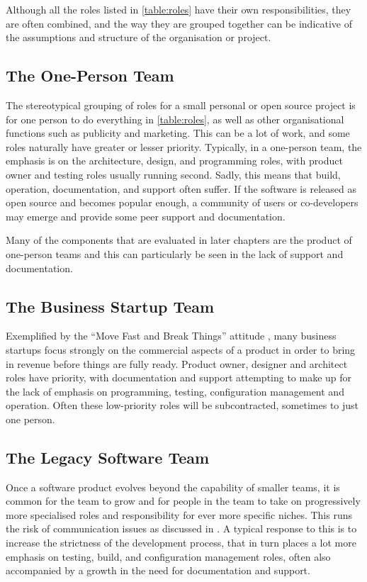 \label{A37}
Although all the roles listed in \autoref{table:roles} have their own responsibilities, they are often combined, and the way they are grouped together can be indicative of the assumptions and structure of the organisation or project.

\subsection{The One-Person Team}
The stereotypical grouping of roles for a small personal or open source project is for one person to do everything in \autoref{table:roles}, as well as other organisational functions such as publicity and marketing. This can be a lot of work, and some roles naturally have greater or lesser priority. Typically, in a one-person team, the emphasis is on the architecture, design, and programming roles, with product owner and testing roles usually running second. Sadly, this means that build, operation, documentation, and support often suffer. If the software is released as open source and becomes popular enough, a community of users or co-developers may emerge and provide some peer support and documentation.

Many of the components that are evaluated in later chapters are the product of one-person teams and this can particularly be seen in the lack of support and documentation.

\subsection{The Business Startup Team}
Exemplified by the \enquote{Move Fast and Break Things} attitude \citep{Taplin2018}, many business startups focus strongly on the commercial aspects of a product in order to bring in revenue before things are fully ready. Product owner, designer and architect roles have priority, with documentation and support attempting to make up for the lack of emphasis on programming, testing, configuration management and operation. Often these low-priority roles will be subcontracted, sometimes to just one person.

\subsection{The Legacy Software Team}
\label{A44}
Once a software product evolves beyond the capability of smaller teams, it is common for the team to grow and for people in the team to take on progressively more specialised roles and responsibility for ever more specific niches. This runs the risk of communication issues as discussed in \citet{Brooks1995}. A typical response to this is to increase the strictness of the development process, that in turn places a lot more emphasis on testing, build, and configuration management roles, often also accompanied by a growth in the need for documentation and support.


